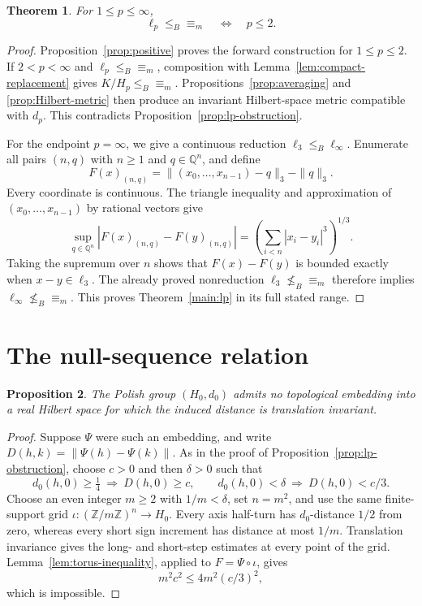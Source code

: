 \documentclass[11pt]{article}
\newtheorem{theorem}{Theorem}[section]
\newtheorem{proposition}[theorem]{Proposition}
\theoremstyle{definition}
\newcommand{\Z}{\mathbb Z}
\newcommand{\ME}{\mathrel{\equiv_m}}
\newcommand{\leB}{\mathrel{\leq_B}}
\newcommand{\nleB}{\mathrel{\nleq_B}}
\newcommand{\Q}{\mathbb Q}
\begin{document}
\begin{theorem}\label{thm:lp}
For $1\le p\leq\infty$,
\[
 \ell_p\leB\ME\quad\Longleftrightarrow\quad p\le2.
\]
\end{theorem}
\begin{proof}
Proposition~\ref{prop:positive} proves the forward construction for
$1\le p\le2$. If $2<p<\infty$ and $\ell_p\leB\ME$, composition with
Lemma~\ref{lem:compact-replacement} gives $K/H_p\leB\ME$.
Propositions~\ref{prop:averaging} and \ref{prop:Hilbert-metric} then
produce an invariant Hilbert-space metric compatible with $d_p$.
This contradicts Proposition~\ref{prop:lp-obstruction}.

For the endpoint $p=\infty$, we give a continuous reduction
$\ell_3\leB\ell_\infty$. Enumerate all pairs $(n,q)$ with $n\geq1$
and $q\in\Q^n$, and define
\[
 F(x)_{(n,q)}
   =\|(x_0,\ldots,x_{n-1})-q\|_3-\|q\|_3.
\]
Every coordinate is continuous. The triangle inequality and approximation
of $(x_0,\ldots,x_{n-1})$ by rational vectors give
\[
 \sup_{q\in\Q^n}|F(x)_{(n,q)}-F(y)_{(n,q)}|
    =\left(\sum_{i<n}|x_i-y_i|^3\right)^{1/3}.
\]
Taking the supremum over $n$ shows that $F(x)-F(y)$ is bounded exactly
when $x-y\in\ell_3$. The already proved nonreduction
$\ell_3\nleB{\equiv_m}$ therefore implies
$\ell_\infty\nleB{\equiv_m}$. This proves Theorem~\ref{main:lp}
in its full stated range.
\end{proof}

\section{The null-sequence relation}
\begin{proposition}\label{prop:c0-obstruction}
The Polish group $(H_0,d_0)$ admits no topological embedding into a real
Hilbert space for which the induced distance is translation invariant.
\end{proposition}
\begin{proof}
Suppose $\Psi$ were such an embedding, and write
$D(h,k)=\|\Psi(h)-\Psi(k)\|$. As in the proof of
Proposition~\ref{prop:lp-obstruction}, choose $c>0$ and then $\delta>0$
such that
\[
 d_0(h,0)\ge\tfrac14\ \Longrightarrow\ D(h,0)\ge c,
 \qquad
 d_0(h,0)<\delta\ \Longrightarrow\ D(h,0)<c/3.
\]
Choose an even integer $m\ge2$ with $1/m<\delta$, set $n=m^2$, and
use the same finite-support grid $\iota:(\Z/m\Z)^n\to H_0$.
Every axis half-turn has $d_0$-distance $1/2$ from zero, whereas every
short sign increment has distance at most $1/m$. Translation invariance
gives the long- and short-step estimates at every point of the grid.
Lemma~\ref{lem:torus-inequality}, applied to $F=\Psi\circ\iota$, gives
\[
 m^2c^2\le 4m^2(c/3)^2,
\]
which is impossible.
\end{proof}
\end{document}
